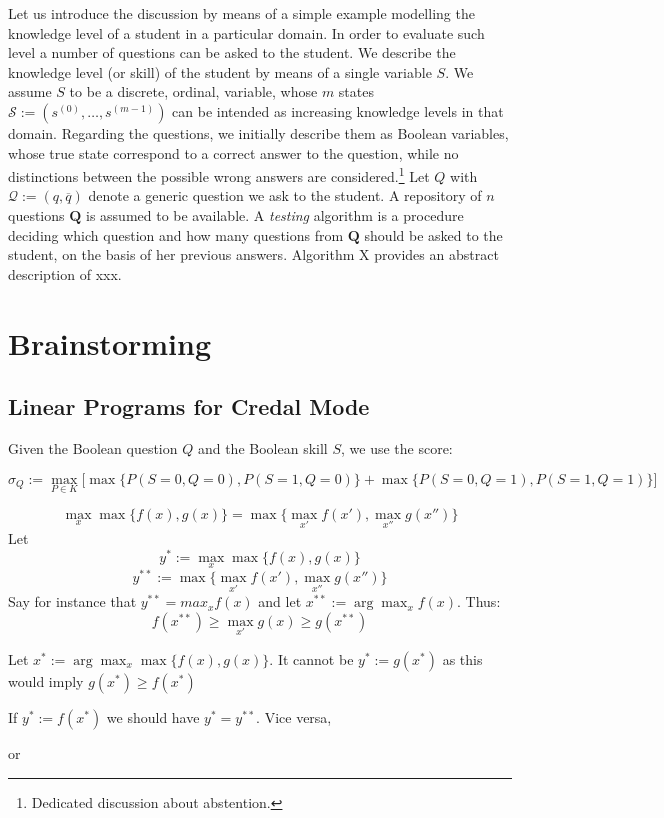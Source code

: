 \documentclass[runningheads]{llncs}
\begin{document}
Let us introduce the discussion by means of a simple example modelling the knowledge level of a student in a particular domain. In order to evaluate such level a number of questions can be asked to the student. We describe the knowledge level (or skill) of the student by means of a single variable $S$. We assume $S$ to be a discrete, ordinal, variable, whose $m$ states $\mathcal{S}:=(s^{(0)},\ldots,s^{(m-1)})$ can be intended as increasing knowledge levels in that domain. Regarding the questions, we initially describe them as Boolean variables, whose true state correspond to a correct answer to the question, while no distinctions between the possible wrong answers are considered.\footnote{Dedicated discussion about abstention.} Let $Q$ with $\mathcal{Q}:=(q,\overline{q})$ denote a generic question we ask to the student. A repository of $n$ questions $\bm{Q}$ is assumed to be available. A \emph{testing} algorithm is a procedure deciding which question and how many questions from $\bm{Q}$ should be asked to the student, on the basis of her previous answers. Algorithm X provides an abstract description of xxx.


	\section{Brainstorming}
	
	\subsection{Linear Programs for Credal Mode}
	
	Given the Boolean question $Q$ and the Boolean skill $S$, we use the score:
	
	\begin{equation}
		\sigma_Q := \max_{P\in K} \bigl[ 
		\max \{ P(S=0,Q=0) , P(S=1,Q=0) \}  + \max \{ P(S=0,Q=1),P(S=1,Q=1)\}
		\bigr]
	\end{equation}
	
	\begin{theorem}
		\begin{equation}
			\max_{x}  \max \{ f(x) , g(x) \}  
			=
			\max \{ \max_{x'} f(x') , \max_{x''} g(x'') \} 
		\end{equation}
		Let 
		$$y^{*}:=\max_x \max\{f(x),g(x)\}$$
		$$y^{**}:= \max \{ \max_{x'} f(x') , \max_{x''} g(x'') \}$$
		Say for instance that $y^{**}=max_x f(x)$ and let $x^{**}:=\arg\max_x f(x)$. Thus:
		$$f(x^{**})\geq \max_{x'} g(x) \geq g(x^{**})$$ 
		
		Let $x^{*}:= \arg\max_x \max\{f(x),g(x)\}$. 
		It cannot be $y^{*}:=g(x^{*})$ as this would imply $g(x^{*}) \geq f(x^{*})$ 
		
		
		
		
		If $y^{*}:=f(x^{*})$ we should have $y^{*}=y^{**}$.
		Vice versa, 
		
		or
	\end{theorem}
	
\end{document}
